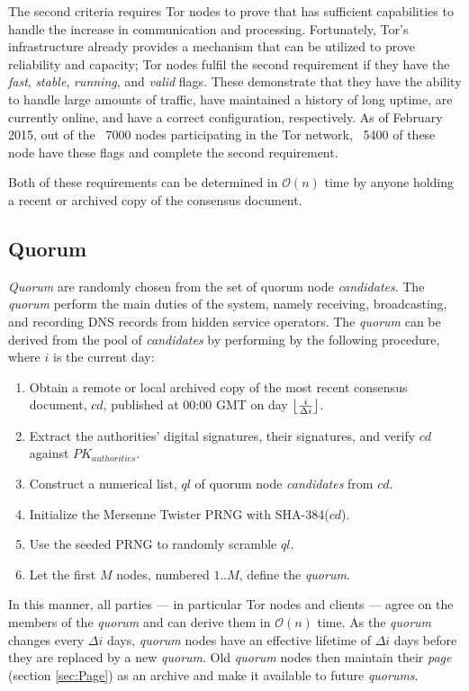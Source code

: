 The second criteria requires Tor nodes to prove that has sufficient capabilities to handle the increase in communication and processing. Fortunately, Tor's infrastructure already provides a mechanism that can be utilized to prove reliability and capacity; Tor nodes fulfil the second requirement if they have the \emph{fast}, \emph{stable}, \emph{running}, and \emph{valid} flags. These demonstrate that they have the ability to handle large amounts of traffic, have maintained a history of long uptime, are currently online, and have a correct configuration, respectively. As of February 2015, out of the ~7000 nodes participating in the Tor network, ~5400 of these node have these flags and complete the second requirement.

Both of these requirements can be determined in $ \mathcal{O}(n) $ time by anyone holding a recent or archived copy of the consensus document.

\subsection{Quorum}
\label{sec:Quorum}

\emph{Quorum} are randomly chosen from the set of quorum node \emph{candidates}. The \emph{quorum} perform the main duties of the system, namely receiving, broadcasting, and recording DNS records from hidden service operators. The \emph{quorum} can be derived from the pool of \emph{candidates} by performing by the following procedure, where $ i $ is the current day:

\begin{enumerate}
	\item Obtain a remote or local archived copy of the most recent consensus document, $ cd $, published at 00:00 GMT on day $ \floor[\big]{\frac{i}{\Delta i}} $.
	\item Extract the authorities' digital signatures, their signatures, and verify $ cd $ against $ PK_{authorities} $.
	\item Construct a numerical list, $ ql $ of quorum node \emph{candidates} from $ cd $.
	\item Initialize the Mersenne Twister PRNG with SHA-384($ cd $).
	\item Use the seeded PRNG to randomly scramble $ ql $.
	\item Let the first $ M $ nodes, numbered $ 1 .. M $, define the \emph{quorum}.
\end{enumerate}

In this manner, all parties --- in particular Tor nodes and clients --- agree on the members of the \emph{quorum} and can derive them in $ \mathcal{O}(n) $ time. As the \emph{quorum} changes every $ \Delta i $ days, \emph{quorum} nodes have an effective lifetime of $ \Delta i $ days before they are replaced by a new \emph{quorum}. Old \emph{quorum} nodes then maintain their \emph{page} (section \ref{sec:Page}) as an archive and make it available to future \emph{quorums}.

